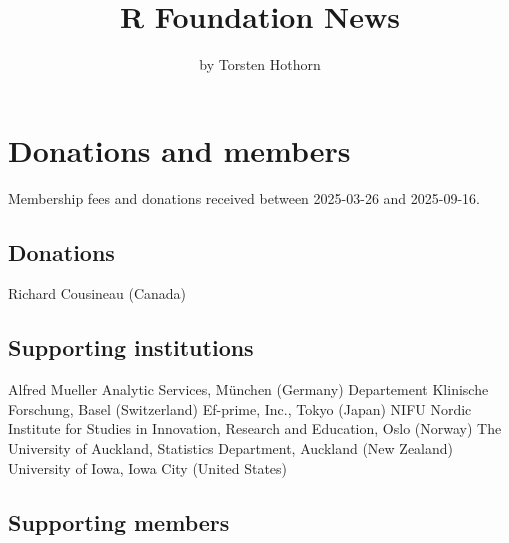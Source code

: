 \title{R Foundation News}


\author{by Torsten Hothorn}

\maketitle


\section{Donations and members}\label{donations-and-members}

Membership fees and donations received between
2025-03-26 and 2025-09-16.

\subsection{Donations}\label{donations}

Richard Cousineau (Canada)

\subsection{Supporting institutions}\label{supporting-institutions}

Alfred Mueller Analytic Services, München (Germany)
Departement Klinische Forschung, Basel (Switzerland)
Ef-prime, Inc., Tokyo (Japan)
NIFU Nordic Institute for Studies in Innovation, Research and Education, Oslo (Norway)
The University of Auckland, Statistics Department, Auckland (New Zealand)
University of Iowa, Iowa City (United States)

\subsection{Supporting members}\label{supporting-members}

